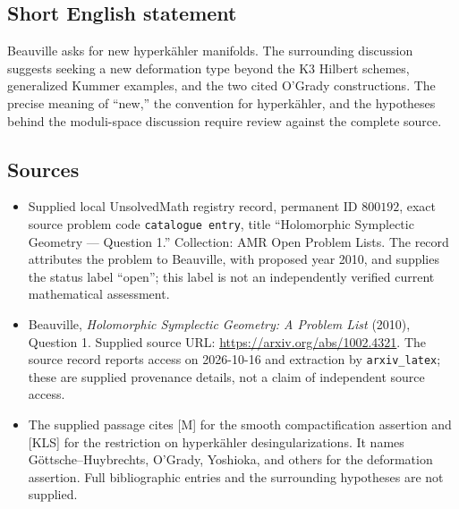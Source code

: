\documentclass[11pt]{article}
\begin{document}
\subsection{Short English statement}
Beauville asks for new hyperk\"ahler manifolds. The surrounding discussion suggests seeking a new deformation type beyond the K3 Hilbert schemes, generalized Kummer examples, and the two cited O'Grady constructions. The precise meaning of ``new,'' the convention for hyperk\"ahler, and the hypotheses behind the moduli-space discussion require review against the complete source.
\subsection{Sources}
\begin{itemize}
\item Supplied local UnsolvedMath registry record, permanent ID \(800192\), exact source problem code \texttt{catalogue entry}, title ``Holomorphic Symplectic Geometry --- Question 1.'' Collection: AMR Open Problem Lists. The record attributes the problem to Beauville, with proposed year 2010, and supplies the status label ``open''; this label is not an independently verified current mathematical assessment.
\item Beauville, \emph{Holomorphic Symplectic Geometry: A Problem List} (2010), Question 1. Supplied source URL: \url{https://arxiv.org/abs/1002.4321}. The source record reports access on 2026-10-16 and extraction by \texttt{arxiv\_latex}; these are supplied provenance details, not a claim of independent source access.
\item The supplied passage cites [M] for the smooth compactification assertion and [KLS] for the restriction on hyperk\"ahler desingularizations. It names G\"ottsche--Huybrechts, O'Grady, Yoshioka, and others for the deformation assertion. Full bibliographic entries and the surrounding hypotheses are not supplied.
\end{itemize}
\end{document}
